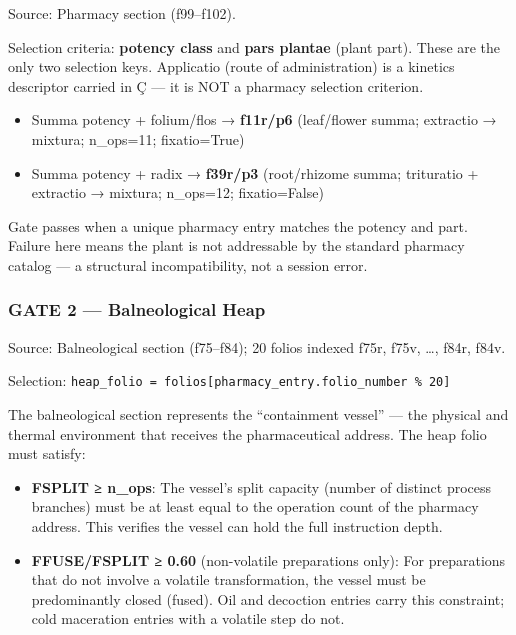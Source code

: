 Source: Pharmacy section (f99--f102).

Selection criteria: \textbf{potency class} and \textbf{pars plantae}
(plant part). These are the only two selection keys. Applicatio (route
of administration) is a kinetics descriptor carried in Ç --- it is NOT a
pharmacy selection criterion.

\begin{itemize}
\tightlist
\item
  Summa potency + folium/flos → \textbf{f11r/p6} (leaf/flower summa;
  extractio → mixtura; n\_ops=11; fixatio=True)
\item
  Summa potency + radix → \textbf{f39r/p3} (root/rhizome summa;
  trituratio + extractio → mixtura; n\_ops=12; fixatio=False)
\end{itemize}

Gate passes when a unique pharmacy entry matches the potency and part.
Failure here means the plant is not addressable by the standard pharmacy
catalog --- a structural incompatibility, not a session error.

\hypertarget{gate-2-balneological-heap}{%
\subsubsection{GATE 2 --- Balneological
Heap}\label{gate-2-balneological-heap}}

Source: Balneological section (f75--f84); 20 folios indexed f75r, f75v,
\ldots, f84r, f84v.

Selection:
\texttt{heap\_folio\ =\ folios{[}pharmacy\_entry.folio\_number\ \%\ 20{]}}

The balneological section represents the ``containment vessel'' --- the
physical and thermal environment that receives the pharmaceutical
address. The heap folio must satisfy:

\begin{itemize}
\item
  \textbf{FSPLIT ≥ n\_ops}: The vessel's split capacity (number of
  distinct process branches) must be at least equal to the operation
  count of the pharmacy address. This verifies the vessel can hold the
  full instruction depth.
\item
  \textbf{FFUSE/FSPLIT ≥ 0.60} (non-volatile preparations only): For
  preparations that do not involve a volatile transformation, the vessel
  must be predominantly closed (fused). Oil and decoction entries carry
  this constraint; cold maceration entries with a volatile step do not.
\end{itemize}

